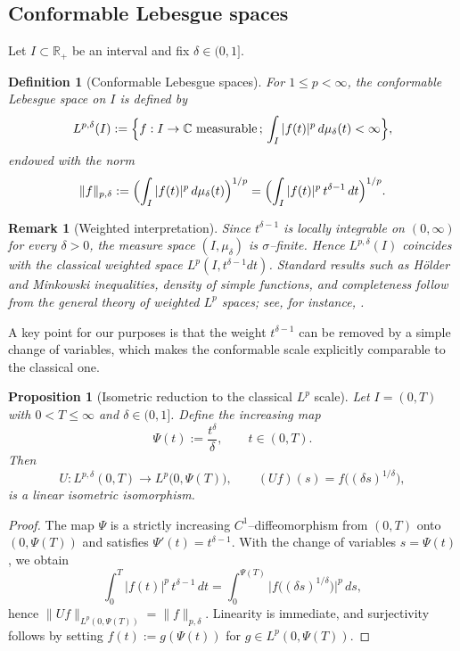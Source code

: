 \documentclass[preprint,12pt]{elsarticle}
\newtheorem{definition}{Definition}
\newtheorem{proposition}{Proposition}
\newtheorem{remark}{Remark}
\newtheorem{proof}{Proof}
\newcommand{\R}{\mathbb {R}}
\newcommand{\C}{\mathbb {C}}
\begin{document}
\subsection{Conformable Lebesgue spaces}

Let $I\subset\R_+$ be an interval and fix $\delta\in(0,1]$.

\begin{definition}[Conformable Lebesgue spaces]\label{def:Lpdelta}
For $1\le p<\infty$, the conformable Lebesgue space on $I$ is defined by
\[
L^{p,\delta}(I)
:=
\Bigl\{
f:I\to\C \ \text{measurable} \,;\,
\int_I |f(t)|^p\,d\mu_\delta(t)<\infty
\Bigr\},
\]
endowed with the norm
\[
\|f\|_{p,\delta}
:=
\Bigl(\int_I |f(t)|^p\,d\mu_\delta(t)\Bigr)^{1/p}
=
\Bigl(\int_I |f(t)|^p\,t^{\delta-1}\,dt\Bigr)^{1/p}.
\]
\end{definition}

\begin{remark}[Weighted interpretation]\label{rem:weightedLp}
Since $t^{\delta-1}$ is locally integrable on $(0,\infty)$ for every $\delta>0$,
the measure space $(I,\mu_\delta)$ is $\sigma$--finite.
Hence $L^{p,\delta}(I)$ coincides with the classical weighted space
$L^p(I,t^{\delta-1}dt)$.
Standard results such as H\"older and Minkowski inequalities, density of simple
functions, and completeness follow from the general theory of weighted $L^p$
spaces; see, for instance, \cite{KufnerWeighted,AdamsFournier}.
\end{remark}

A key point for our purposes is that the weight $t^{\delta-1}$ can be removed by
a simple change of variables, which makes the conformable scale explicitly
comparable to the classical one.

\begin{proposition}[Isometric reduction to the classical $L^p$ scale]\label{prop:isometryLp}
Let $I=(0,T)$ with $0<T\le\infty$ and $\delta\in(0,1]$.
Define the increasing map
\[
\Psi(t):=\frac{t^\delta}{\delta}, \qquad t\in(0,T).
\]
Then
\[
U:L^{p,\delta}(0,T)\longrightarrow L^p\bigl(0,\Psi(T)\bigr),
\qquad
(Uf)(s)=f\bigl((\delta s)^{1/\delta}\bigr),
\]
is a linear isometric isomorphism.
\end{proposition}

\begin{proof}
The map $\Psi$ is a strictly increasing $C^1$--diffeomorphism from $(0,T)$ onto
$(0,\Psi(T))$ and satisfies $\Psi'(t)=t^{\delta-1}$.
With the change of variables $s=\Psi(t)$, we obtain
\[
\int_0^T |f(t)|^p\,t^{\delta-1}\,dt
=
\int_0^{\Psi(T)} \bigl|f\bigl((\delta s)^{1/\delta}\bigr)\bigr|^p\,ds,
\]
hence $\|Uf\|_{L^p(0,\Psi(T))}=\|f\|_{p,\delta}$.
Linearity is immediate, and surjectivity follows by setting
$f(t):=g(\Psi(t))$ for $g\in L^p(0,\Psi(T))$.
\end{proof}
\end{document}
